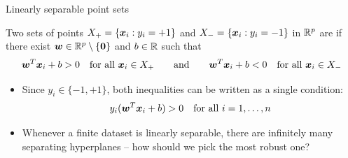 \documentclass[aspectratio=169]{beamer}\usepackage[]{graphicx}\usepackage[]{xcolor}
\begin{document}
\begin{frame}{Linearly separable point sets}
    \begin{importantdefinition}
        Two sets of points $X_+ = \{\bm{x}_i : y_i = +1\}$ and $X_- = \{\bm{x}_i : y_i = -1\}$ in $\mathbb{R}^p$ are  if there exist $\bw \in \IR^p \setminus \{\b0\}$ and $b \in \mathbb{R}$ such that
        \[
            \bm{w}^T \bm{x}_i + b > 0 \quad \text{for all } \bm{x}_i \in X_+ \qquad \text{and} \qquad \bm{w}^T \bm{x}_i + b < 0 \quad \text{for all } \bm{x}_i \in X_-
        \]
    \end{importantdefinition}
    \vfill
    \begin{itemize}
        \item Since $y_i \in \{-1, +1\}$, both inequalities can be written as a single condition:
        \[
            y_i(\bm{w}^T \bm{x}_i + b) > 0 \quad \text{for all } i = 1, \ldots, n
        \]
        \item Whenever a finite dataset is linearly separable, there are infinitely many separating hyperplanes -- how should we pick the most robust one?
    \end{itemize}
\end{frame}
\end{document}
